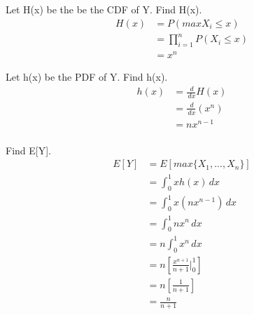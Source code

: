 \section{}

Let H(x) be the be the CDF of Y. Find H(x).
\begin{align*}
    H(x) &= P(max X_i \leq x) \\
	&= \prod_{i=1}^n P(X_i \leq x) \\
	&= x^n
\end{align*}

Let h(x) be the PDF of Y. Find h(x).
\begin{align*}
    h(x) &= \frac{\,d}{\,dx} H(x) \\
	&= \frac{\,d}{\,dx} (x^n) \\
	&= n x^{n-1} \\
\end{align*}

Find E[Y].
\begin{align*}
    E[Y] &= E[max\{X_1, ... , X_n\}] \\
	&= \int_0^1 x h(x) \,dx \\
	&= \int_0^1 x (n x^{n-1}) \,dx \\
	&= \int_0^1 n x^n \,dx \\
	&= n \int_0^1 x^n \,dx \\
	&= n [\frac{x^{n+1}}{n+1} |_0^1] \\ %
	&= n [\frac{1}{n+1}] \\
	&= \frac{n}{n+1}
\end{align*}
